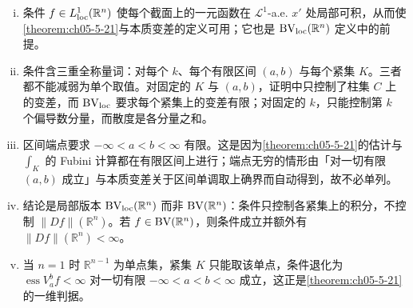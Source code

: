 \documentclass[../../main.tex]{subfiles}%
\begin{document}
\begin{remark}\label{remark:ch05-thm-5-22-条件}
\begin{enumerate}[(i)]
\item 条件 $f\in L^1_{\mathrm{loc}}(\mathbb{R}^n)$ 使每个截面上的一元函数在 $\mathcal{L}^1$-a.e. $x'$ 处局部可积，从而使\cref{theorem:ch05-5-21}与本质变差的定义可用；它也是 $\mathrm{BV}_{\mathrm{loc}}(\mathbb{R}^n)$ 定义中的前提。%
\item 条件含三重全称量词：对每个 $k$、每个有限区间 $(a,b)$ 与每个紧集 $K$。三者都不能减弱为单个取值。对固定的 $K$ 与 $(a,b)$，证明中只控制了柱集 $C$ 上的变差，而 $\mathrm{BV}_{\mathrm{loc}}$ 要求每个紧集上的变差有限；对固定的 $k$，只能控制第 $k$ 个偏导数分量，而散度是各分量之和。
\item 区间端点要求 $-\infty<a<b<\infty$ 有限。这是因为\cref{theorem:ch05-5-21}的估计与 $\int_K$ 的 Fubini 计算都在有限区间上进行；端点无穷的情形由「对一切有限 $(a,b)$ 成立」与本质变差关于区间单调取上确界而自动得到，故不必单列。%
\item 结论是局部版本 $\mathrm{BV}_{\mathrm{loc}}(\mathbb{R}^n)$ 而非 $\mathrm{BV}(\mathbb{R}^n)$：条件只控制各紧集上的积分，不控制 $\lVert Df\rVert(\mathbb{R}^n)$。若 $f\in\mathrm{BV}(\mathbb{R}^n)$，则条件成立并额外有 $\lVert Df\rVert(\mathbb{R}^n)<\infty$。
\item 当 $n=1$ 时 $\mathbb{R}^{n-1}$ 为单点集，紧集 $K$ 只能取该单点，条件退化为 $\operatorname{ess}V_a^b f<\infty$ 对一切有限 $-\infty<a<b<\infty$ 成立，这正是\cref{theorem:ch05-5-21}的一维判据。%
\end{enumerate}
\end{remark}
\end{document}
